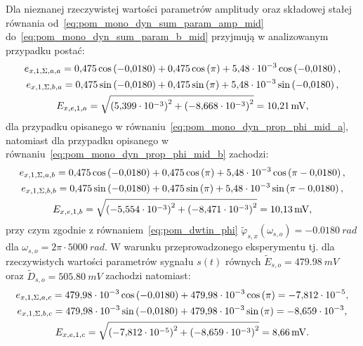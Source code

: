 Dla nieznanej rzeczywistej wartości parametrów amplitudy oraz składowej stałej równania od~\eqref{eq:pom_mono_dyn_sum_param_amp_mid} do~\eqref{eq:pom_mono_dyn_sum_param_b_mid} przyjmują w analizowanym przypadku postać:
\begin{gather}
e_{x,1,\Sigma,a,a} = \num{0.475} \cos \left(\num{-0.0180}\right) + \num{0.475} \cos \left(\pi\right) + \num{5.48e-3} \cos \left(\num{-0.0180}\right) \label{eq:pom_mono_dyn_sum_param_a_mid_val_a}, \\
e_{x,1,\Sigma,b,a} = \num{0.475} \sin \left(\num{-0.0180}\right) + \num{0.475} \sin \left(\pi\right) + \num{5.48e-3} \sin \left(\num{-0.0180}\right) \label{eq:pom_mono_dyn_sum_param_b_mid_val_a}, \\
E_{x,e,1,a} = \sqrt{\left(\num{5.399e-3}\right)^{2} + \left(\num{-8.668e-3}\right)^{2}} = \qty{10.21}{mV} \label{eq:pom_mono_dyn_sum_param_amp_mid_val_a},
\end{gather}
dla przypadku opisanego w równaniu~\eqref{eq:pom_mono_dyn_prop_phi_mid_a}, natomiast dla przypadku opisanego w równaniu~\eqref{eq:pom_mono_dyn_prop_phi_mid_b} zachodzi:
\begin{gather}
e_{x,1,\Sigma,a,b} = \num{0.475} \cos \left(\num{-0.0180}\right) + \num{0.475} \cos \left(\pi\right) + \num{5.48e-3} \cos \left(\pi - \num{0.0180}\right) \label{eq:pom_mono_dyn_sum_param_a_mid_val_b}, \\
e_{x,1,\Sigma,b,b} = \num{0.475} \sin \left(\num{-0.0180}\right) + \num{0.475} \sin \left(\pi\right) + \num{5.48e-3} \sin \left(\pi - \num{0.0180}\right) \label{eq:pom_mono_dyn_sum_param_b_mid_val_b}, \\
E_{x,e,1,b} = \sqrt{\left(\num{-5.554e-3}\right)^{2} + \left(\num{-8.471e-3}\right)^{2}} = \qty{10.13}{mV} \label{eq:pom_mono_dyn_sum_param_amp_mid_val_b},
\end{gather}
przy czym zgodnie z równaniem~\eqref{eq:pom_dwtin_phi} $\tilde{\varphi}_{s,x}(\omega_{s,o}) = \qty{-0.0180}{rad}$ dla $\omega_{s,o} = 2\pi \cdot \qty{5000}{rad}$. W warunku przeprowadzonego eksperymentu tj. dla rzeczywistych wartości parametrów sygnału $s(t)$ równych $\tilde{E}_{s,o} = \qty{479.98}{mV}$ oraz $\tilde{D}_{s,o} = \qty{505.80}{mV}$ zachodzi natomiast:
\begin{gather}
e_{x,1,\Sigma,a,c} = \qty{479.98e-3} \cos \left(\num{-0.0180}\right) + \qty{479.98e-3} \cos \left(\pi\right) = \num{-7.812e-5} \label{eq:pom_mono_dyn_sum_param_a_mid_val_c}, \\
e_{x,1,\Sigma,b,c} = \qty{479.98e-3} \sin \left(\num{-0.0180}\right) + \qty{479.98e-3} \sin \left(\pi\right) = \num{-8.659e-3} \label{eq:pom_mono_dyn_sum_param_b_mid_val_c}, \\
E_{x,e,1,c} = \sqrt{\left(\num{-7.812e-5}\right)^{2} + \left(\num{-8.659e-3}\right)^{2}} = \qty{8.66}{mV} \label{eq:pom_mono_dyn_sum_param_amp_mid_val_c}.
\end{gather}
